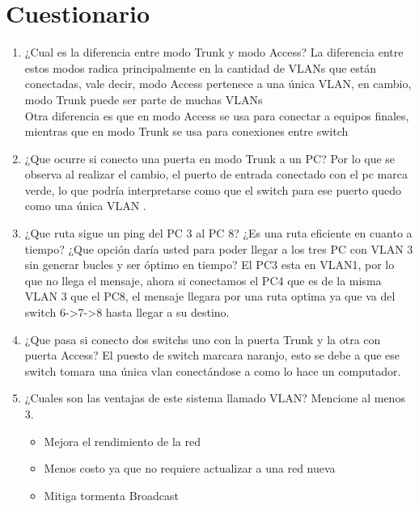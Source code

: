 \documentclass[spanish]{udpreport}
\begin{document}
\chapter{Cuestionario}
\begin{enumerate}
    \item ¿Cual es la diferencia entre modo Trunk y modo Access?
    La diferencia entre estos modos radica principalmente en la cantidad de VLANs que están conectadas, vale decir, modo Access pertenece a una única VLAN, en cambio, modo Trunk puede ser parte de muchas VLANs\\Otra diferencia es que en modo Access se usa para conectar a equipos finales, mientras que en modo Trunk se usa para conexiones entre switch
    \item ¿Que ocurre si conecto una puerta en modo Trunk a un PC?
    Por lo que se observa al realizar el cambio, el puerto de entrada conectado con el pc marca verde, lo que podría interpretarse como que el switch para ese puerto quedo como una única VLAN .
    \item ¿Que ruta sigue un ping del PC 3 al PC 8? ¿Es una ruta eficiente en
     cuanto a tiempo? ¿Que opción daría usted para poder llegar a los tres PC
     con VLAN 3 sin generar bucles y ser óptimo en tiempo?
     El PC3 esta en VLAN1, por lo que no llega el mensaje, ahora si conectamos el PC4 que es de la misma VLAN 3 que el PC8, el mensaje llegara por una ruta optima ya que va del switch 6->7->8 hasta llegar a su destino.
    \item ¿Que pasa si conecto dos switchs uno con la puerta Trunk y la otra con
     puerta Access?
     El puesto de switch marcara naranjo, esto se debe a que ese switch tomara una única vlan conectándose a como lo hace un computador.
    \item ¿Cuales son las ventajas de este sistema llamado VLAN? Mencione al
     menos 3.
     \begin{itemize}
         \item Mejora el rendimiento de la red
         \item Menos costo ya que no requiere actualizar a una red nueva
         \item Mitiga tormenta Broadcast
     \end{itemize}


\end{enumerate}
\end{document}
